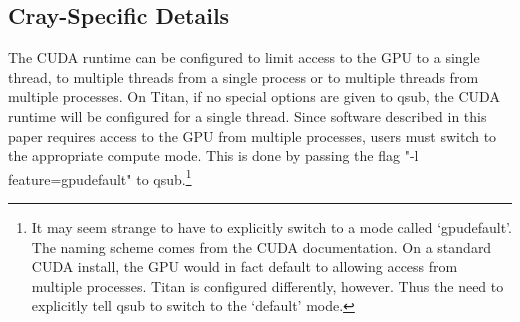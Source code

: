 \subsection{Cray-Specific Details}
\label{subsec:cray-specific}

The CUDA runtime can be configured to limit access to the GPU to a single thread, to multiple threads from a single process or to multiple threads from multiple processes.  On Titan, if no special options are given to qsub, the CUDA runtime will be configured for a single thread.  Since software described in this paper requires access to the GPU from multiple processes, users must switch to the appropriate compute mode.  This is done by passing the flag "-l feature=gpudefault" to qsub.\footnote{It may seem strange to have to explicitly switch to a mode called `gpudefault'.  The naming scheme comes from the CUDA documentation.  On a standard CUDA install, the GPU would in fact default to allowing access from multiple processes.  Titan is configured differently, however.  Thus the need to explicitly tell qsub to switch to the `default' mode.}

